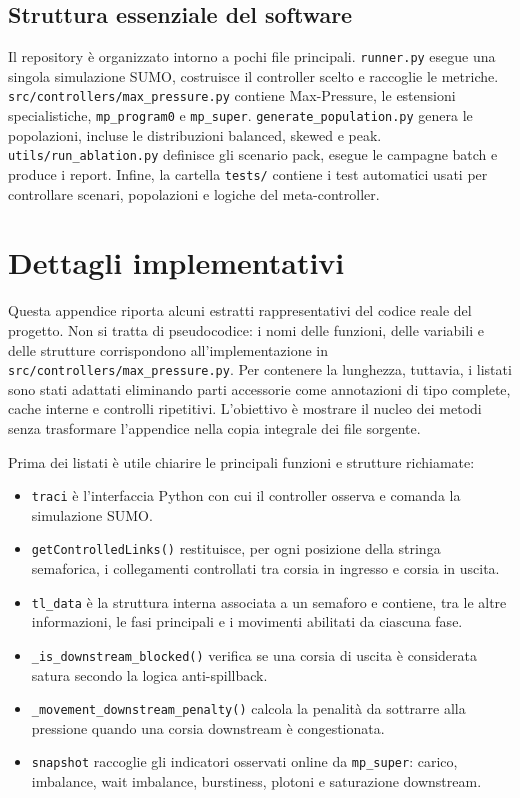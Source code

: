 \documentclass[12pt,a4paper,oneside]{report}
\numberwithin{equation}{chapter}
\begin{document}
\section{Struttura essenziale del software}
\label{app:software}

Il repository è organizzato intorno a pochi file principali. \texttt{runner.py}
esegue una singola simulazione SUMO, costruisce il controller scelto e raccoglie
le metriche. \texttt{src/controllers/max\_pressure.py} contiene Max-Pressure,
le estensioni specialistiche, \texttt{mp\_program0} e \texttt{mp\_super}.
\texttt{generate\_population.py} genera le popolazioni, incluse le
distribuzioni balanced, skewed e peak. \texttt{utils/run\_ablation.py}
definisce gli scenario pack, esegue le campagne batch e produce i report.
Infine, la cartella \texttt{tests/} contiene i test automatici usati per
controllare scenari, popolazioni e logiche del meta-controller.

\chapter{Dettagli implementativi}
\label{app:listati}

Questa appendice riporta alcuni estratti rappresentativi del codice reale del
progetto. Non si tratta di pseudocodice: i nomi delle funzioni, delle variabili
e delle strutture corrispondono all'implementazione in
\texttt{src/controllers/max\_pressure.py}. Per contenere la lunghezza, tuttavia,
i listati sono stati adattati eliminando parti accessorie come annotazioni di
tipo complete, cache interne e controlli ripetitivi. L'obiettivo è mostrare il
nucleo dei metodi senza trasformare l'appendice nella copia integrale dei file
sorgente.

Prima dei listati è utile chiarire le principali funzioni e strutture richiamate:

\begin{itemize}
    \item \texttt{traci} è l'interfaccia Python con cui il controller osserva e
    comanda la simulazione SUMO.
    \item \texttt{getControlledLinks()} restituisce, per ogni posizione della
    stringa semaforica, i collegamenti controllati tra corsia in ingresso e
    corsia in uscita.
    \item \texttt{tl\_data} è la struttura interna associata a un semaforo e
    contiene, tra le altre informazioni, le fasi principali e i movimenti
    abilitati da ciascuna fase.
    \item \texttt{\_is\_downstream\_blocked()} verifica se una corsia di uscita è
    considerata satura secondo la logica anti-spillback.
    \item \texttt{\_movement\_downstream\_penalty()} calcola la penalità da
    sottrarre alla pressione quando una corsia downstream è congestionata.
    \item \texttt{snapshot} raccoglie gli indicatori osservati online da
    \texttt{mp\_super}: carico, imbalance, wait imbalance, burstiness, plotoni e
    saturazione downstream.
\end{itemize}
\end{document}
